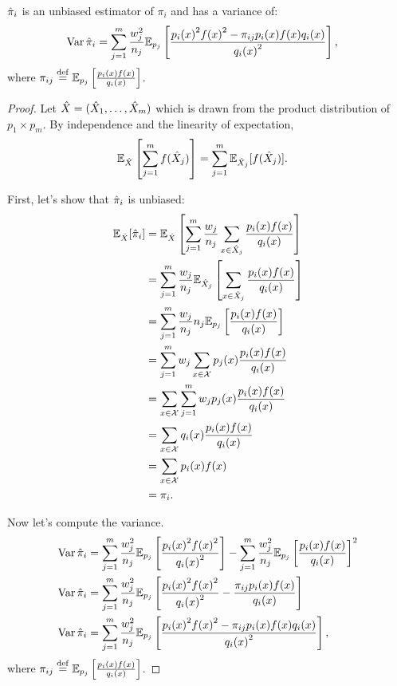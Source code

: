 \begin{theorem}
\label{thm:pih}
  ${\hat{\pi}}_i$ is an unbiased estimator of $\pi_i$ and has a variance of:
  \begin{align*}
    \operatorname{Var}{{\hat{\pi}}_i} &= \sum_{j=1}^m \frac{w_j^2}{n_j} \mathbb{E}_{p_j}\left[\frac{{p_i(x)}^2{f(x)}^2 - \pi_{ij}p_i(x)f(x)q_i(x)}{{q_i(x)}^2} \right],
  \end{align*}
  where $\pi_{ij} \stackrel{\rm def}{=} \mathbb{E}_{p_j}\left[\frac{p_i(x)f(x)}{q_i(x)} \right]$.
\end{theorem}
\begin{proof}
  Let ${\hat{X}} = ({\hat{X}}_1, \ldots, {\hat{X}}_m)$ which is drawn from the product distribution of $p_1 \times p_m$.
  By independence and the linearity of expectation, 
  \begin{align*}
    \mathbb{E}_{{\hat{X}}}\left[\sum_{j=1}^m f({\hat{X}}_j) \right] &= \sum_{j=1}^m \mathbb{E}_{{\hat{X}}_j}[f({\hat{X}}_j)].
  \end{align*}

  First, let's show that ${\hat{\pi}}_i$ is unbiased:
  \begin{align*}
    \mathbb{E}_{{\hat{X}}}[{\hat{\pi}}_i] 
    &= \mathbb{E}_{{\hat{X}}}\left[\sum_{j=1}^m \frac{w_j}{n_j} \sum_{x \in {\hat{X}}_j} \frac{p_i(x) f(x)}{q_i(x)} \right] \\
    &= \sum_{j=1}^m \frac{w_j}{n_j} \mathbb{E}_{{\hat{X}}_j}\left[\sum_{x \in {\hat{X}}_j} \frac{p_i(x) f(x)}{q_i(x)} \right] \\
    &= \sum_{j=1}^m \frac{w_j}{n_j} n_j \mathbb{E}_{p_j}\left[\frac{p_i(x) f(x)}{q_i(x)}\right] \\
    &= \sum_{j=1}^m w_j \sum_{x \in \mathcal{X}} p_j(x) \frac{p_i(x) f(x) }{q_i(x)}\\
    &= \sum_{x \in \mathcal{X}} \sum_{j=1}^m w_j p_j(x) \frac{p_i(x) f(x) }{q_i(x)}\\
    &= \sum_{x \in \mathcal{X}} q_i(x) \frac{p_i(x) f(x)}{q_i(x)} \\
    &= \sum_{x \in \mathcal{X}} p_i(x) f(x) \\
    &= \pi_i.
  \end{align*}

  Now let's compute the variance.
  \begin{align*}
    \operatorname{Var}{{\hat{\pi}}_i} &= \sum_{j=1}^m \frac{w_j^2}{n_j} \mathbb{E}_{p_j}\left[\frac{{p_i(x)}^2{f(x)}^2}{{q_i(x)}^2} \right]
    - \sum_{j=1}^m \frac{w_j^2}{n_j} {\mathbb{E}_{p_j}\left[\frac{p_i(x)f(x)}{q_i(x)} \right]}^2 \\
    \operatorname{Var}{{\hat{\pi}}_i} &= \sum_{j=1}^m \frac{w_j^2}{n_j} \mathbb{E}_{p_j}\left[\frac{{p_i(x)}^2{f(x)}^2}{{q_i(x)}^2} - \frac{\pi_{ij} p_i(x) f(x)}{q_i(x)} \right] \\
    \operatorname{Var}{{\hat{\pi}}_i} &= \sum_{j=1}^m \frac{w_j^2}{n_j} \mathbb{E}_{p_j}\left[\frac{{p_i(x)}^2{f(x)}^2 - \pi_{ij}p_i(x)f(x)q_i(x)}{{q_i(x)}^2} \right],
  \end{align*}
  where $\pi_{ij} \stackrel{\rm def}{=} \mathbb{E}_{p_j}\left[\frac{p_i(x)f(x)}{q_i(x)} \right]$.
\end{proof}

